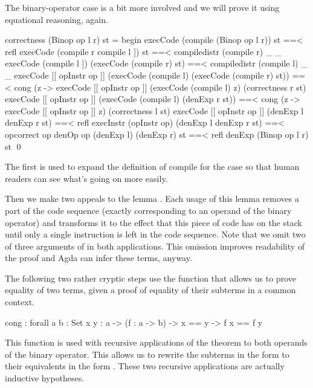 \noindent The binary-operator case is a bit more involved and we will prove it
using equational reasoning, again.

\begin{code}
  correctness (Binop op l r) st = begin
    execCode (compile (Binop op l r)) st
      ==< refl \>
    execCode (compile r \app compile l \app [[ opInstr op ]]) st
      ==< compile\-distr (compile r) _ _ \>
    execCode (compile l \app [[ opInstr op ]]) (execCode (compile r) st)
      ==< compile\-distr (compile l) _ _ \>
    execCode [[ opInstr op ]] (execCode (compile l) (execCode (compile r) st))
      ==< cong (\lam z -> execCode [[ opInstr op ]] (execCode (compile l) z) (correctness r st) \>
    execCode [[ opInstr op ]] (execCode (compile l) (denExp r \scons st))
      ==< cong (\lam z -> execCode [[ opInstr op ]] z) (correctness l st) \>
    execCode [[ opInstr op ]] (denExp l \scons denExp r \scons st)
      ==< refl \>
    execInstr (opInstr op) (denExp l \scons denExp r \scons st)
      ==< op\-correct op \>
    denOp op (denExp l) (denExp r) \scons st
      ==< refl \>
    denExp (Binop op l r) \scons st
    \qed
\end{code}

\noindent The first  is used to expand the definition of compile
for the  case so that human readers can see what's going on more
easily.

Then we make two appeals to the lemma . Each usage of this
lemma removes a part of the code sequence (exactly corresponding to an operand
of the binary operator) and transforms it to the effect that this piece of code
has on the stack until only a single instruction is left in the code sequence.
Note that we omit two of three arguments of  in both
applications. This omission improves readability of the proof and Agda can
infer these terms, anyway.

The following two rather cryptic steps use the function  that allows
us to prove equality of two terms, given a proof of equality of their subterms
in a common context.

\begin{code}
  cong : forall {a b : Set} {x y : a}
    -> (f : a -> b)
    -> x == y -> f x == f y
\end{code}

\noindent This function is used with recursive applications of the theorem
 to both operands of the binary operator. This allows us
to rewrite the subterms in the form 
to their equivalents in the form . These
two recursive applications are actually inductive hypotheses.

